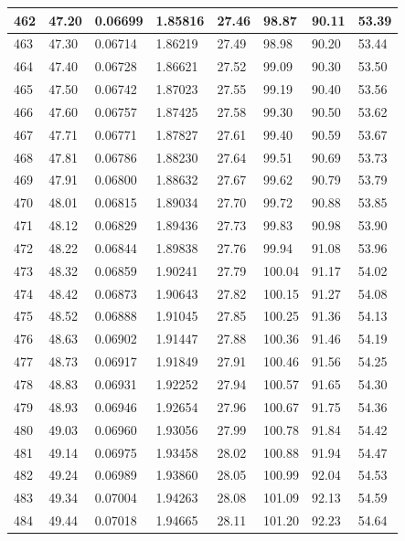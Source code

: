 \documentclass[12pt,a4paper,twoside]{article}
\begin{document}
\begin{center}
\begin{longtable}{l l l l | l l l l}
462 & 47.20 & 0.06699 & 1.85816 & 27.46 & 98.87 & 90.11 & 53.39 \\ \hline
463 & 47.30 & 0.06714 & 1.86219 & 27.49 & 98.98 & 90.20 & 53.44 \\ \hline
464 & 47.40 & 0.06728 & 1.86621 & 27.52 & 99.09 & 90.30 & 53.50 \\ \hline
465 & 47.50 & 0.06742 & 1.87023 & 27.55 & 99.19 & 90.40 & 53.56 \\ \hline
466 & 47.60 & 0.06757 & 1.87425 & 27.58 & 99.30 & 90.50 & 53.62 \\ \hline
467 & 47.71 & 0.06771 & 1.87827 & 27.61 & 99.40 & 90.59 & 53.67 \\ \hline
468 & 47.81 & 0.06786 & 1.88230 & 27.64 & 99.51 & 90.69 & 53.73 \\ \hline
469 & 47.91 & 0.06800 & 1.88632 & 27.67 & 99.62 & 90.79 & 53.79 \\ \hline
470 & 48.01 & 0.06815 & 1.89034 & 27.70 & 99.72 & 90.88 & 53.85 \\ \hline
471 & 48.12 & 0.06829 & 1.89436 & 27.73 & 99.83 & 90.98 & 53.90 \\ \hline
472 & 48.22 & 0.06844 & 1.89838 & 27.76 & 99.94 & 91.08 & 53.96 \\ \hline
473 & 48.32 & 0.06859 & 1.90241 & 27.79 & 100.04 & 91.17 & 54.02 \\ \hline
474 & 48.42 & 0.06873 & 1.90643 & 27.82 & 100.15 & 91.27 & 54.08 \\ \hline
475 & 48.52 & 0.06888 & 1.91045 & 27.85 & 100.25 & 91.36 & 54.13 \\ \hline
476 & 48.63 & 0.06902 & 1.91447 & 27.88 & 100.36 & 91.46 & 54.19 \\ \hline
477 & 48.73 & 0.06917 & 1.91849 & 27.91 & 100.46 & 91.56 & 54.25 \\ \hline
478 & 48.83 & 0.06931 & 1.92252 & 27.94 & 100.57 & 91.65 & 54.30 \\ \hline
479 & 48.93 & 0.06946 & 1.92654 & 27.96 & 100.67 & 91.75 & 54.36 \\ \hline
480 & 49.03 & 0.06960 & 1.93056 & 27.99 & 100.78 & 91.84 & 54.42 \\ \hline
481 & 49.14 & 0.06975 & 1.93458 & 28.02 & 100.88 & 91.94 & 54.47 \\ \hline
482 & 49.24 & 0.06989 & 1.93860 & 28.05 & 100.99 & 92.04 & 54.53 \\ \hline
483 & 49.34 & 0.07004 & 1.94263 & 28.08 & 101.09 & 92.13 & 54.59 \\ \hline
484 & 49.44 & 0.07018 & 1.94665 & 28.11 & 101.20 & 92.23 & 54.64 \\ \hline

\end{longtable}
\end{center}
\end{document}
